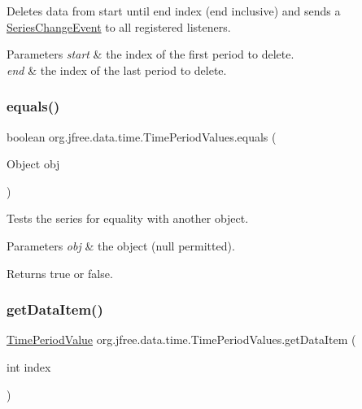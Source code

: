 Deletes data from start until end index (end inclusive) and sends a \mbox{\hyperlink{}{Series\+Change\+Event}} to all registered listeners.


\begin{DoxyParams}{Parameters}
{\em start} & the index of the first period to delete. \\
\hline
{\em end} & the index of the last period to delete. \\
\hline
\end{DoxyParams}
\mbox{\label{classorg_1_1jfree_1_1data_1_1time_1_1_time_period_values_ab3611807c571e4effa525440ae81501f}} 
\subsubsection{\texorpdfstring{equals()}{equals()}}
{\footnotesize\ttfamily boolean org.\+jfree.\+data.\+time.\+Time\+Period\+Values.\+equals (\begin{DoxyParamCaption}\item[{Object}]{obj }\end{DoxyParamCaption})}

Tests the series for equality with another object.


\begin{DoxyParams}{Parameters}
{\em obj} & the object ({\ttfamily null} permitted).\\
\hline
\end{DoxyParams}
\begin{DoxyReturn}{Returns}
{\ttfamily true} or {\ttfamily false}. 
\end{DoxyReturn}
\mbox{\label{classorg_1_1jfree_1_1data_1_1time_1_1_time_period_values_acfb6760194a12e035ba7fe02d45dd099}} 
\subsubsection{\texorpdfstring{get\+Data\+Item()}{getDataItem()}}
{\footnotesize\ttfamily \mbox{\hyperlink{classorg_1_1jfree_1_1data_1_1time_1_1_time_period_value}{Time\+Period\+Value}} org.\+jfree.\+data.\+time.\+Time\+Period\+Values.\+get\+Data\+Item (\begin{DoxyParamCaption}\item[{int}]{index }\end{DoxyParamCaption})}

